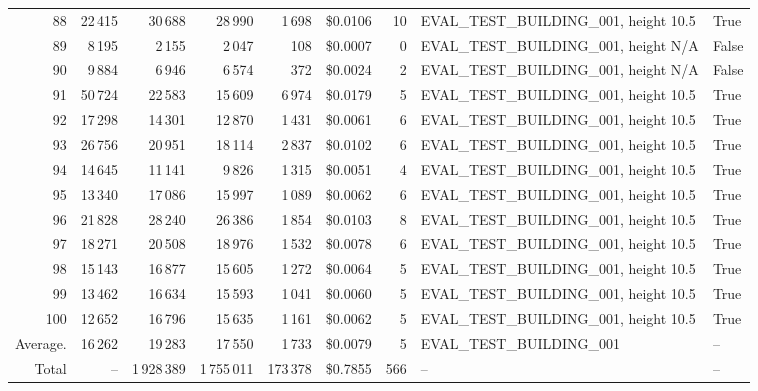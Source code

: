 \documentclass[a4paper,11pt]{article}
\begin{document}
\begin{table}[ht]
\begin{tabular}{r r r r r r r p{3cm} l}
88 & 22\,415 & 30\,688 & 28\,990 & 1\,698 & \$0.0106 & 10 & EVAL\_TEST\_BUILDING\_001, height 10.5 & True \\
89 & 8\,195 & 2\,155 & 2\,047 & 108 & \$0.0007 & 0 & EVAL\_TEST\_BUILDING\_001, height N/A & False \\
90 & 9\,884 & 6\,946 & 6\,574 & 372 & \$0.0024 & 2 & EVAL\_TEST\_BUILDING\_001, height N/A & False \\
91 & 50\,724 & 22\,583 & 15\,609 & 6\,974 & \$0.0179 & 5 & EVAL\_TEST\_BUILDING\_001, height 10.5 & True \\
92 & 17\,298 & 14\,301 & 12\,870 & 1\,431 & \$0.0061 & 6 & EVAL\_TEST\_BUILDING\_001, height 10.5 & True \\
93 & 26\,756 & 20\,951 & 18\,114 & 2\,837 & \$0.0102 & 6 & EVAL\_TEST\_BUILDING\_001, height 10.5 & True \\
94 & 14\,645 & 11\,141 & 9\,826 & 1\,315 & \$0.0051 & 4 & EVAL\_TEST\_BUILDING\_001, height 10.5 & True \\
95 & 13\,340 & 17\,086 & 15\,997 & 1\,089 & \$0.0062 & 6 & EVAL\_TEST\_BUILDING\_001, height 10.5 & True \\
96 & 21\,828 & 28\,240 & 26\,386 & 1\,854 & \$0.0103 & 8 & EVAL\_TEST\_BUILDING\_001, height 10.5 & True \\
97 & 18\,271 & 20\,508 & 18\,976 & 1\,532 & \$0.0078 & 6 & EVAL\_TEST\_BUILDING\_001, height 10.5 & True \\
98 & 15\,143 & 16\,877 & 15\,605 & 1\,272 & \$0.0064 & 5 & EVAL\_TEST\_BUILDING\_001, height 10.5 & True \\
99 & 13\,462 & 16\,634 & 15\,593 & 1\,041 & \$0.0060 & 5 & EVAL\_TEST\_BUILDING\_001, height 10.5 & True \\
100 & 12\,652 & 16\,796 & 15\,635 & 1\,161 & \$0.0062 & 5 & EVAL\_TEST\_BUILDING\_001, height 10.5 & True \\
\hline
Average. & 16\,262 & 19\,283 & 17\,550 & 1\,733 & \$0.0079 & 5 & EVAL\_TEST\_BUILDING\_001 & -- \\
Total & -- & 1\,928\,389 & 1\,755\,011 & 173\,378 & \$0.7855 & 566 & -- & -- \\
\hline
\end{tabular}
\end{table}

\clearpage
\end{document}
